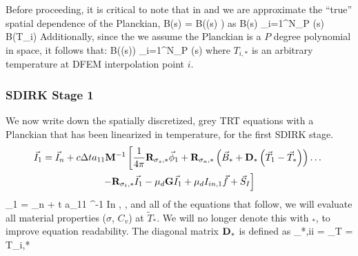 Before proceeding, it is critical to note that in  and  we are approximate the ``true'' spatial dependence of the Planckian, 
\benum
B(s) = B((s) ) \pec
\eenum
as
\benum
B(s) \approx \sum_{i=1}^{N_P}{ (s) B(T_i) } \pep
\eenum
Additionally, since the we assume the Planckian is a $P$ degree polynomial in space, it follows that:
\benum
B((s)) \approx \sum_{i=1}^{N_P}{ (s) \left[ B(T_{i,*}) + (T_i - T_{i,*} ) \frac{d B}{d T} \bigg \lvert_{T = T_{i,*}}\right] } \pec 
\eenum
where $T_{i,*}$ is an arbitrary temperature at DFEM interpolation point $i$.

\subsubsection{SDIRK Stage 1}
We now write down the spatially discretized, grey TRT equations with a Planckian that has been linearized in temperature, for the first SDIRK stage.
\begin{multline}
\vec{I}_1 = \vec{I}_n + c\Delta t a_{11} \mathbf M^{-1}\left[   
\frac{1}{4\pi}\mathbf{R}_{\sigma_s,*}\vec{\phi}_1 + \mathbf{R}_{\sigma_a,*}\left(\vec{B}_* +  \mathbf{D}_*  \left(\vec{T}_1 -\vec{T}_*  \right)   \right) \dots \right. \\
\left. - \mathbf{R}_{\sigma_t,*} \vec{I}_1 - \mu_d \mathbf{G}\vec{I}_1 + \mu_d I_{in,1}\vec{f} 
+ \vec{S}_I
\right]
\label{eq:first_I}
\end{multline}
\benum
{}_1  = _n + \Delta t a_{11} ^{-1}
\label{eq:first_T}
\eenum
In , , and all of the equations that follow, we will evaluate all material properties ($\sigma$, $C_v$) at $\widetilde{T}_*$.
We will no longer denote this with $_*$, to improve equation readability. 
The diagonal matrix $ \mathbf{D}_* $ is defined as
\benum
{}_{*,ii} =  \bigg \lvert_{T = T_{i,*}} \pep
\eenum

